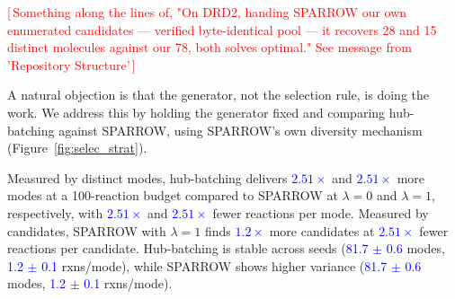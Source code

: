 \documentclass{article}
\newcommand{\pending}[1]{\textcolor{red}{[\,#1\,]}}
\newcommand{\checkval}[1]{\textcolor{blue}{#1}}
\begin{document}
 \pending{Something along the lines of, "On DRD2, handing SPARROW our own enumerated candidates — verified byte-identical pool — it recovers 28 and 15 distinct molecules against our 78, both solves optimal." See message from 'Repository Structure'}




A natural objection is that the generator, not the selection rule, is doing the work. We address this by holding the generator fixed \citep{gainski2026scent} and comparing hub-batching against SPARROW, using SPARROW's own diversity mechanism \citep{fromer2025diversity} (Figure~\ref{fig:selec_strat}).

Measured by distinct modes, hub-batching delivers \checkval{$2.51\times$} and \checkval{$2.51\times$} more modes at a 100-reaction budget compared to SPARROW at $\lambda = 0$ and $\lambda = 1$, respectively, with \checkval{$2.51\times$} and \checkval{$2.51\times$} fewer reactions per mode. Measured by candidates, SPARROW with $\lambda=1$ finds \checkval{$1.2\times$} more candidates at \checkval{$2.51\times$} fewer reactions per candidate. Hub-batching is stable across seeds (\checkval{81.7 $\pm$ 0.6} modes, \checkval{1.2 $\pm$ 0.1} rxns/mode), while SPARROW shows higher variance (\checkval{81.7 $\pm$ 0.6} modes, \checkval{1.2 $\pm$ 0.1} rxns/mode).
\end{document}
